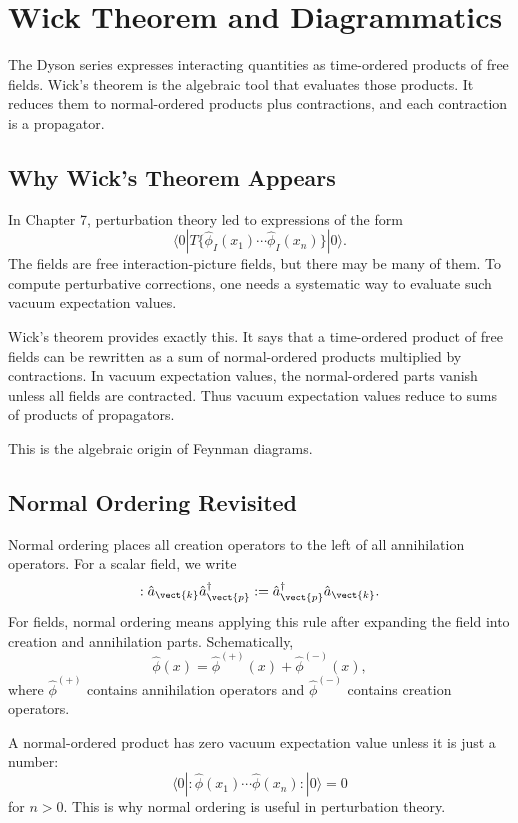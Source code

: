 \chapter{Wick Theorem and Diagrammatics}

\begin{remarkbox}
The Dyson series expresses interacting quantities as time-ordered products of
free fields. Wick's theorem is the algebraic tool that evaluates those products.
It reduces them to normal-ordered products plus contractions, and each
contraction is a propagator.
\end{remarkbox}

\section{Why Wick's Theorem Appears}

In Chapter 7, perturbation theory led to expressions of the form
\[
    \langle0|T\{\hat\phi_I(x_1)\cdots\hat\phi_I(x_n)\}|0\rangle.
\]
The fields are free interaction-picture fields, but there may be many of them.
To compute perturbative corrections, one needs a systematic way to evaluate such
vacuum expectation values.

Wick's theorem provides exactly this. It says that a time-ordered product of
free fields can be rewritten as a sum of normal-ordered products multiplied by
contractions. In vacuum expectation values, the normal-ordered parts vanish
unless all fields are contracted. Thus vacuum expectation values reduce to sums
of products of propagators.

This is the algebraic origin of Feynman diagrams.

\section{Normal Ordering Revisited}

Normal ordering places all creation operators to the left of all annihilation
operators. For a scalar field, we write
\[
    :\hat a_{\vect{k}}\hat a_{\vect{p}}^\dagger:
    = \hat a_{\vect{p}}^\dagger\hat a_{\vect{k}}.
\]
For fields, normal ordering means applying this rule after expanding the field
into creation and annihilation parts. Schematically,
\[
    \hat\phi(x)=\hat\phi^{(+)}(x)+\hat\phi^{(-)}(x),
\]
where \(\hat\phi^{(+)}\) contains annihilation operators and
\(\hat\phi^{(-)}\) contains creation operators.

A normal-ordered product has zero vacuum expectation value unless it is just a
number:
\[
    \langle0|:\hat\phi(x_1)\cdots\hat\phi(x_n):|0\rangle=0
\]
for \(n>0\). This is why normal ordering is useful in perturbation theory.

